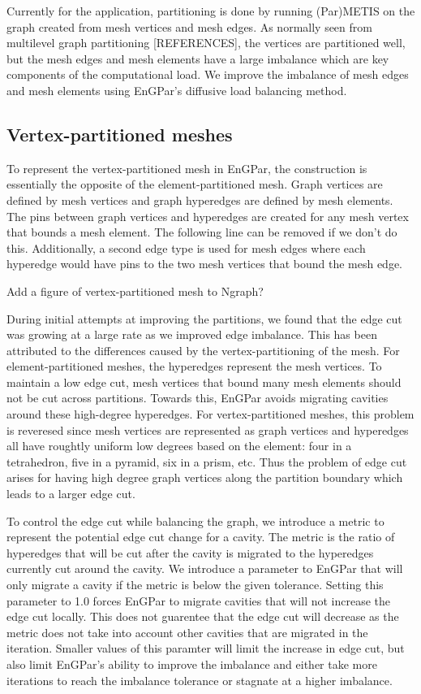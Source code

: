 \documentclass[conference]{IEEEtran}
\begin{document}
Currently for the application, partitioning is done by running (Par)METIS on the graph created
from mesh vertices and mesh edges. As normally seen from multilevel graph
partitioning [REFERENCES],
the vertices are partitioned well, but the mesh edges and mesh elements have a large
imbalance which are key components of the computational load. We improve the imbalance of
mesh edges and mesh elements using EnGPar's diffusive load balancing method.

\subsection{Vertex-partitioned meshes}

To represent the vertex-partitioned mesh in EnGPar, the construction
is essentially the opposite of the element-partitioned mesh. Graph
vertices are defined by mesh vertices and graph hyperedges are defined
by mesh elements. The pins between graph vertices and hyperedges are
created for any mesh vertex that bounds a mesh element.
{\color{red} The following line can be removed if we don't do this.}
Additionally, a second edge type is used for mesh edges where each
hyperedge would have pins to the two mesh vertices that bound the mesh edge.

{\color{red} Add a figure of vertex-partitioned mesh to Ngraph?}

During initial attempts at improving the partitions, we found that the edge cut was growing
at a large rate as we improved edge imbalance. This has been attributed to the differences
caused by the vertex-partitioning of the mesh. For element-partitioned meshes, the hyperedges
represent the mesh vertices. To maintain a low edge cut, mesh vertices that bound many mesh
elements should not be cut across partitions. Towards this, EnGPar avoids migrating cavities
around these high-degree hyperedges. For vertex-partitioned meshes, this problem is reveresed
since mesh vertices are represented as graph vertices and hyperedges all have roughtly uniform
low degrees based on the element: four in a tetrahedron, five in a pyramid, six in a prism, etc.
Thus the problem of edge cut arises for having high degree graph vertices along the partition
boundary which leads to a larger edge cut.

To control the edge cut while balancing the graph, we introduce a metric to represent the
potential edge cut change for a cavity. The metric is the ratio of hyperedges that will be cut
after the cavity is migrated to the hyperedges currently cut around the cavity. We introduce a
parameter to EnGPar that will only migrate a cavity if the metric is below the given tolerance.
Setting this parameter to 1.0 forces EnGPar to migrate cavities that will not increase the edge
cut locally. This does not guarentee that the edge cut will decrease as the metric does not take
into account other cavities that are migrated in the iteration. Smaller values of this
paramter will limit the increase in edge cut, but also limit EnGPar's ability to improve the
imbalance and either take more iterations to reach the imbalance tolerance or stagnate at a
higher imbalance.
\end{document}
